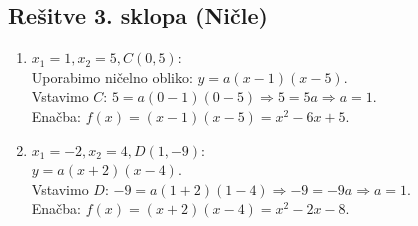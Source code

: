 \documentclass[a4paper,12pt]{article}
\begin{document}
\subsection*{Rešitve 3. sklopa (Ničle)}

\begin{enumerate}
    \item $x_1=1, x_2=5, C(0, 5)$: \\
    Uporabimo ničelno obliko: $y = a(x-1)(x-5)$. \\
    Vstavimo $C$: $5 = a(0-1)(0-5) \Rightarrow 5 = 5a \Rightarrow a=1$. \\
    Enačba: $f(x) = (x-1)(x-5) = x^2 - 6x + 5$.

    \item $x_1=-2, x_2=4, D(1, -9)$: \\
    $y = a(x+2)(x-4)$. \\
    Vstavimo $D$: $-9 = a(1+2)(1-4) \Rightarrow -9 = -9a \Rightarrow a=1$. \\
    Enačba: $f(x) = (x+2)(x-4) = x^2 - 2x - 8$.
\end{enumerate}
\end{document}
